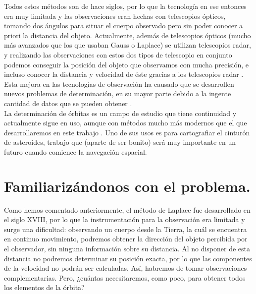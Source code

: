 \documentclass[11pt]{book}
\begin{document}
Todos estos métodos son de hace siglos, por lo que la tecnología en ese entonces era muy limitada y las observaciones eran hechas con telescopios ópticos, tomando dos ángulos para situar el cuerpo observado pero sin poder conocer a priori la distancia del objeto. Actualmente, además de telescopios ópticos (mucho más avanzados que los que usaban Gauss o Laplace) se utilizan telescopios radar, y realizando las observaciones con estos dos tipos de telescopio en conjunto podemos conseguir la posición del objeto que observamos con mucha precisión, e incluso conocer la distancia y velocidad de éste gracias a los telescopios radar \cite{brett_r_wilson}. Esta mejora en las tecnologías de observación ha causado que se desarrollen nuevos problemas de determinación, en su mayor parte debido a la ingente cantidad de datos que se pueden obtener \cite{gronchi}.\\

La determinación de órbitas es un campo de estudio que tiene continuidad y actualmente sigue en uso, aunque con métodos mucho más modernos que el que desarrollaremos en este trabajo \cite{gronchi_unesco}. Uno de sus usos es para cartografiar el cinturón de asteroides, trabajo que (aparte de ser bonito) será muy importante en un futuro cuando comience la navegación espacial.\\


\section{Familiarizándonos con el problema.}
Como hemos comentado anteriormente, el método de Laplace fue desarrollado en el siglo XVIII, por lo que la instrumentación para la observación era limitada y surge una dificultad: observando un cuerpo desde la Tierra, la cuál se encuentra en continuo movimiento, podremos obtener la dirección del objeto percibida por el observador, sin ninguna información sobre su distancia. Al no disponer de esta distancia no podremos determinar su posición exacta, por lo que las componentes de la velocidad no podrán ser calculadas. Así, habremos de tomar observaciones complementarias. Pero, ¿cuántas necesitaremos, como poco, para obtener todos los elementos de la órbita?\\
\end{document}
